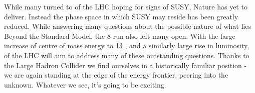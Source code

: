 While many turned to \runone of the LHC hoping for signs of SUSY,
Nature has yet to deliver. Instead the phase space in which SUSY may
reside has been greatly reduced. While answering many questions about
the possible nature of what lies Beyond the Standard Model, the 8
\tev run also left many open. With the large increase of centre of mass energy
to 13 \tev, and a similarly large rise in luminosity, \runtwo of the LHC will
aim to address many of these outstanding questions. Thanks to the Large Hadron
Collider we find ourselves in a historically familiar position - we are again
standing at the edge of the energy frontier, peering into the unknown. Whatever
we see, it's going to be exciting.
